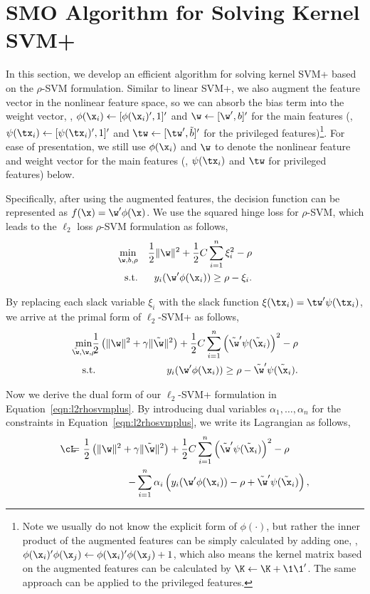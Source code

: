 \section{SMO Algorithm for Solving Kernel SVM+}
In this section, we develop an efficient algorithm for solving kernel SVM+ based on the $\rho$-SVM formulation. Similar to linear SVM+, we also augment the feature vector in the nonlinear feature space, so we can absorb the bias term into the weight vector, \ie, $\phi(\x_i) \leftarrow [\phi(\x_i)', 1]'$ and $\w \leftarrow [\w', b]'$ for the main features (\resp,  $\psi(\tx_i) \leftarrow [\psi(\tx_i)', 1]'$ and $\tw \leftarrow [\tw', \tilde{b}]'$ for the privileged features)\footnote{Note we usually do not know the explicit form of $\phi(\cdot)$, but rather the inner product of the augmented features can be simply calculated by adding one, \ie, $\phi(\x_i)'\phi(\x_j)\leftarrow\phi(\x_i)'\phi(\x_j) + 1$, which also means the kernel matrix based on the augmented features can be calculated by $\K \leftarrow \K + \1\1'$. The same approach can be applied to the privileged features. }. For ease of presentation, we still use $\phi(\x_i)$ and $\w$ to denote the nonlinear feature and weight vector for the main features (\resp, $\psi(\tx_i)$ and $\tw$ for privileged features) below.

Specifically, after using the augmented features, the decision function can be represented as $f(\x) = \w'\phi(\x)$.  We use the squared hinge loss for $\rho$-SVM, which leads to the $\ell_2$ loss $\rho$-SVM formulation as follows,
\begin{eqnarray}\label{eqn:l2rhosvm}
\min_{\w, b, \rho} && \frac{1}{2}\|\w\|^2 + \frac{1}{2}C\sum_{i=1}^{n}\xi_i^2 - \rho\\
\mbox{s.t.} && y_i(\w'\phi(\x_i)) \geq \rho - \xi_i.\nonumber
\end{eqnarray}

By replacing each slack variable $\xi_i$ with the slack function $\xi(\tx_i) = \tw'\psi(\tx_i)$, we arrive at the primal form of $\ell_2$-SVM+ as follows,
\begin{eqnarray}\label{eqn:l2rhosvmplus}
\min_{\tilde{\w}, \w, \rho}\!\!\!\!&&\!\!\!\!\frac{1}{2}\left(\|\w\|^2 + \gamma\|\tilde{\w}\|^2\right)+ \frac{1}{2}C\sum_{i=1}^{n}\left(\tilde{\w}'\psi(\tilde{\x}_i)\right)^2 - \rho\nonumber\\
\mbox{s.t.}\!\!\!\!&&\!\!\!\! y_i(\w'\phi(\x_i)) \geq \rho - \tilde{\w}'\psi(\tilde{\x}_i).
\end{eqnarray}

Now we derive the dual form of our $\ell_2$-SVM+ formulation in Equation~\ref{eqn:l2rhosvmplus}. By introducing dual variables $\alpha_1, \ldots, \alpha_n$ for the constraints in Equation~\ref{eqn:l2rhosvmplus}, we write its Lagrangian as follows,
\begin{eqnarray}\label{eqn:l2svmplus_lagrangian}
\cL\!\!\!\!&=&\!\!\!\!\frac{1}{2}\left(\|\w\|^2 + \gamma\|\tilde{\w}\|^2\right)+ \frac{1}{2}C\sum_{i=1}^{n}\left(\tilde{\w}'\psi(\tilde{\x}_i)\right)^2 - \rho\qquad\\
\!\!\!\!&&\!\!\!\!- \sum_{i=1}^n\alpha_i\left(y_i(\w'\phi(\x_i)) - \rho + \tilde{\w}'\psi(\tilde{\x}_i)\right),\nonumber
\end{eqnarray}

